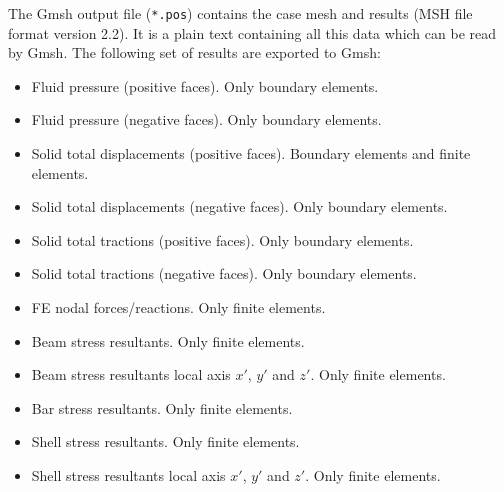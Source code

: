 \documentclass[a4paper,fleqn]{book}
\begin{document}
The Gmsh output file (\texttt{*.pos}) contains the case mesh and results (MSH file format version 2.2). It is a plain text containing all this data which can be read by Gmsh. The following set of results are exported to Gmsh:
\begin{itemize}
    \item Fluid pressure (positive faces). Only boundary elements.
    \item Fluid pressure (negative faces). Only boundary elements.
    \item Solid total displacements (positive faces). Boundary elements and finite elements.
    \item Solid total displacements (negative faces). Only boundary elements.
    \item Solid total tractions (positive faces). Only boundary elements.
    \item Solid total tractions (negative faces). Only boundary elements.
    \item FE nodal forces/reactions. Only finite elements.
    \item Beam stress resultants. Only finite elements.
    \item Beam stress resultants local axis $x'$, $y'$ and $z'$. Only finite elements.
    \item Bar stress resultants. Only finite elements.
    \item Shell stress resultants. Only finite elements.
    \item Shell stress resultants local axis $x'$, $y'$ and $z'$. Only finite elements.
\end{itemize}

%
%
\end{document}
